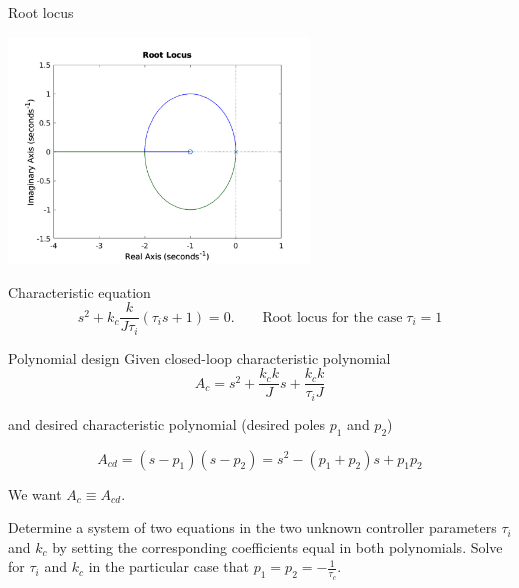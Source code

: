 \documentclass[dvisvgm,hypertex,aspectratio=169]{beamer}
\begin{document}
\begin{frame}[label=C5]{Root locus}
  \begin{center}
    \includegraphics[width=8cm]{rlocus-PI-integrator.png}\\
  \end{center}
  Characteristic equation
  \[ s^2 + k_c\frac{k}{J\tau_i}(\tau_is + 1)= 0. \qquad \text{Root locus for the case}\; \tau_i = 1\]

\end{frame}

\begin{frame}[label=C5E]{Polynomial design}
  Given closed-loop characteristic polynomial
  \[ A_{c} =  s^2 + \frac{k_c k}{J}s + \frac{k_c k}{\tau_i J}\]

  and desired characteristic polynomial (desired poles $p_1$ and $p_2$)

  \[ A_{cd}=(s-p_1)(s-p_2) = s^2 - (p_1+p_2)s + p_1p_2 \]

  We want \(A_c \equiv A_{cd}\).
  
  \alert{Determine} a system of two equations in the two unknown controller parameters $\tau_i$ and $k_c$ by setting the corresponding coefficients equal in both polynomials. \alert{Solve} for $\tau_i$ and $k_c$ in the particular case that \(p_1=p_2=-\frac{1}{\tau_c}\). 
  
\end{frame}

\note{%
}
\end{document}
